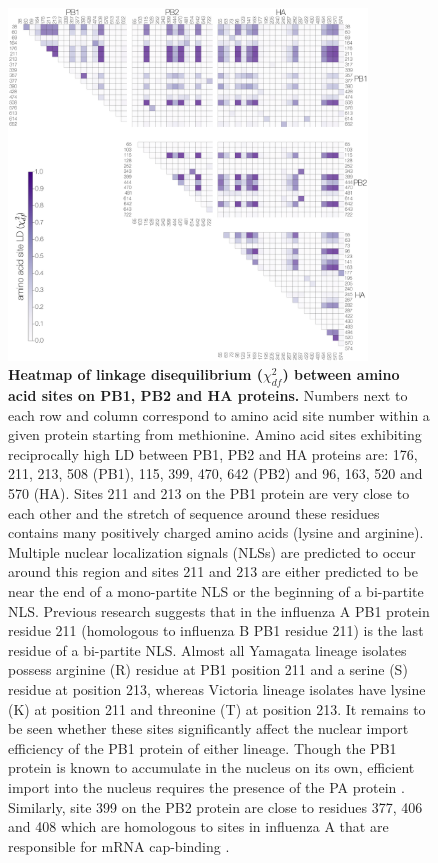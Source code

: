 \documentclass[11pt,oneside,letterpaper]{article}
\newcommand{\chiSq}{\chi^{2}_{df}}
\begin{document}
\begin{figure}
\centering  
\includegraphics[width=0.85\textwidth]  {supp_figures/InfB_LDheatmap.PB1_PB2_HA.1600.aa.ChiSqdf.minorCutoff1percent.png}
\caption{\textbf{Heatmap of linkage disequilibrium ($\chiSq$) between amino acid sites on PB1, PB2 and HA proteins.}
Numbers next to each row and column correspond to amino acid site number within a given protein starting from methionine.
Amino acid sites exhibiting reciprocally high LD between PB1, PB2 and HA proteins are: 176, 211, 213, 508 (PB1), 115, 399, 470, 642 (PB2) and 96, 163, 520 and 570 (HA).
Sites 211 and 213 on the PB1 protein are very close to each other and the stretch of sequence around these residues contains many positively charged amino acids (lysine and arginine).
Multiple nuclear localization signals (NLSs) are predicted to occur around this region and sites 211 and 213 are either predicted to be near the end of a mono-partite NLS or the beginning of a bi-partite NLS.
Previous research \citep{nath1990} suggests that in the influenza A PB1 protein residue 211 (homologous to influenza B PB1 residue 211) is the last residue of a bi-partite NLS.
Almost all Yamagata lineage isolates possess arginine (R) residue at PB1 position 211 and a serine (S) residue at position 213, whereas Victoria lineage isolates have lysine (K) at position 211 and threonine (T) at position 213.
It remains to be seen whether these sites significantly affect the nuclear import efficiency of the PB1 protein of either lineage.
Though the PB1 protein is known to accumulate in the nucleus on its own, efficient import into the nucleus requires the presence of the PA protein \citep{fodor2004}.
Similarly, site 399 on the PB2 protein are close to residues 377, 406 and 408 which are homologous to sites in influenza A that are responsible for mRNA cap-binding \citep{guilligay2008}.}
\label{ChiCore}
\end{figure}
\end{document}

